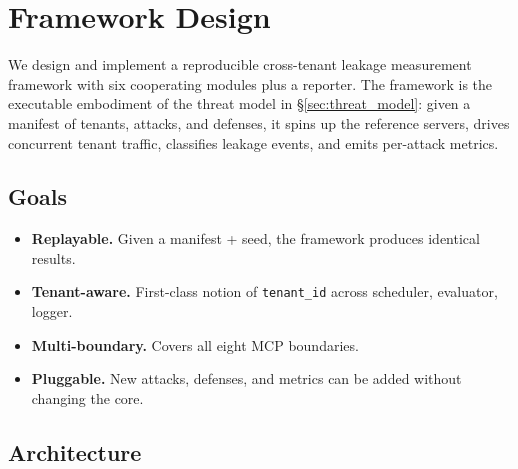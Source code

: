 
\section{Framework Design}\label{sec:framework}

We design and implement a reproducible cross-tenant leakage
measurement framework with six cooperating modules plus a
reporter. The framework is the executable embodiment of the
threat model in \S\ref{sec:threat_model}: given a manifest of
tenants, attacks, and defenses, it spins up the reference
servers, drives concurrent tenant traffic, classifies
leakage events, and emits per-attack metrics.

\subsection{Goals}

\begin{itemize}
  \item \textbf{Replayable.} Given a manifest + seed, the
        framework produces identical results.
  \item \textbf{Tenant-aware.} First-class notion of
        \texttt{tenant\_id} across scheduler, evaluator, logger.
  \item \textbf{Multi-boundary.} Covers all eight MCP
        boundaries.
  \item \textbf{Pluggable.} New attacks, defenses, and metrics
        can be added without changing the core.
\end{itemize}

\subsection{Architecture}

